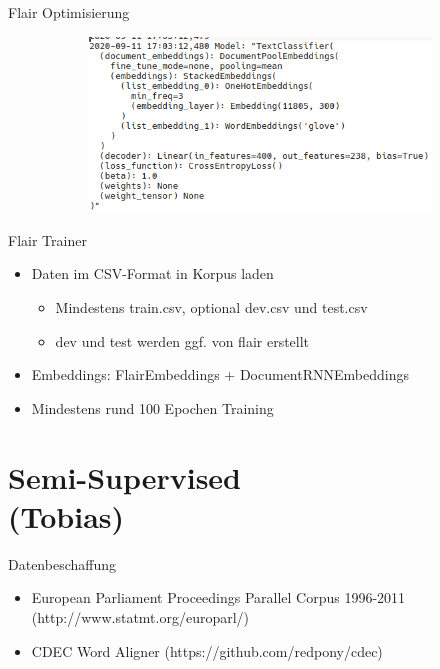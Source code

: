 \documentclass[xcolor=table]{beamer}
\begin{document}
\begin{frame}[t]{Flair Optimisierung}
\begin{figure}
\begin{subfigure}{.3\textwidth}
	\end{subfigure}%
	\begin{subfigure}{.3\textwidth}
		\includegraphics[scale=.3]{flair_best_try.png}
	\end{subfigure}%
\end{figure}
\end{frame}

\begin{frame}[t]{Flair Trainer}\vspace{10pt}
\begin{itemize}
\item Daten im CSV-Format in Korpus laden
\begin{itemize}
\item Mindestens train.csv, optional dev.csv und test.csv
\item dev und test werden ggf. von flair erstellt
\end{itemize}
\item Embeddings: FlairEmbeddings + DocumentRNNEmbeddings
\item Mindestens rund 100 Epochen Training
\end{itemize}
\end{frame}


\section{Semi-Supervised\\(Tobias)}
\begin{frame}[t]{Datenbeschaffung}\vspace{10pt}
\begin{itemize}
\item European Parliament Proceedings Parallel Corpus 1996-2011 (http://www.statmt.org/europarl/)
\item CDEC Word Aligner (https://github.com/redpony/cdec)
\end{itemize}
\end{frame}
\end{document}
